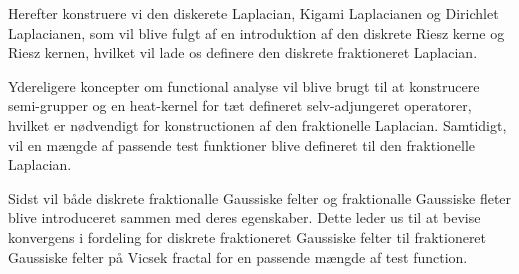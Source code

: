 \vspace{5mm}
Herefter konstruere vi den diskerete Laplacian, Kigami Laplacianen og Dirichlet Laplacianen, som vil blive fulgt af en introduktion af den diskrete Riesz kerne og Riesz kernen, hvilket vil lade os definere den diskrete fraktioneret Laplacian. 

Ydereligere koncepter om functional analyse vil blive brugt til at konstrucere semi-grupper og en heat-kernel for tæt defineret selv-adjungeret operatorer, hvilket er nødvendigt for konstructionen af den fraktionelle Laplacian. Samtidigt, vil en mængde af passende test funktioner blive defineret til den fraktionelle Laplacian.

\vspace{5mm}
Sidst vil både diskrete fraktionalle Gaussiske felter og fraktionalle Gaussiske fleter blive introduceret sammen med deres egenskaber. Dette leder us til at bevise konvergens i fordeling for diskrete fraktioneret Gaussiske felter til fraktioneret Gaussiske felter på Vicsek fractal for en passende mængde af test function.

